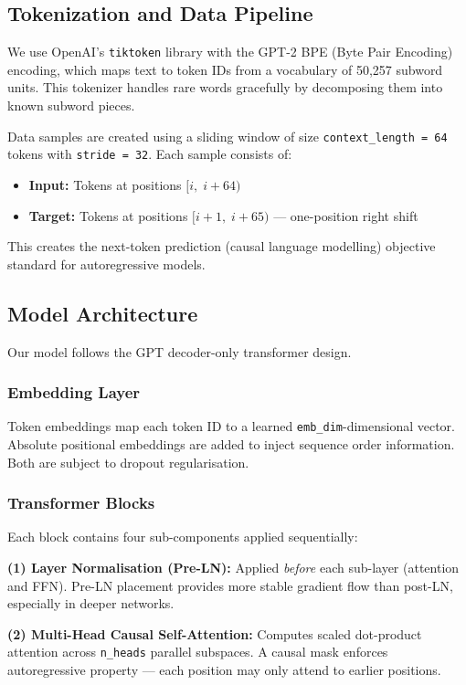 \documentclass[12pt,a4paper]{article}
\begin{document}
\subsection{Tokenization and Data Pipeline}

We use OpenAI's \texttt{tiktoken} library with the GPT-2 BPE (Byte Pair Encoding) encoding, which maps text to token IDs from a vocabulary of 50,257 subword units. This tokenizer handles rare words gracefully by decomposing them into known subword pieces.

Data samples are created using a sliding window of size \texttt{context\_length = 64} tokens with \texttt{stride = 32}. Each sample consists of:
\begin{itemize}[leftmargin=1.8cm]
  \item \textbf{Input:} Tokens at positions $[i,\; i + 64)$
  \item \textbf{Target:} Tokens at positions $[i+1,\; i + 65)$ — one-position right shift
\end{itemize}

This creates the next-token prediction (causal language modelling) objective standard for autoregressive models.

\subsection{Model Architecture}

Our model follows the GPT decoder-only transformer design.

\subsubsection{Embedding Layer}
Token embeddings map each token ID to a learned \texttt{emb\_dim}-dimensional vector. Absolute positional embeddings are added to inject sequence order information. Both are subject to dropout regularisation.

\subsubsection{Transformer Blocks}
Each block contains four sub-components applied sequentially:

\textbf{(1) Layer Normalisation (Pre-LN):} Applied \textit{before} each sub-layer (attention and FFN). Pre-LN placement provides more stable gradient flow than post-LN, especially in deeper networks.

\textbf{(2) Multi-Head Causal Self-Attention:} Computes scaled dot-product attention across \texttt{n\_heads} parallel subspaces. A causal mask enforces autoregressive property — each position may only attend to earlier positions.
\end{document}
